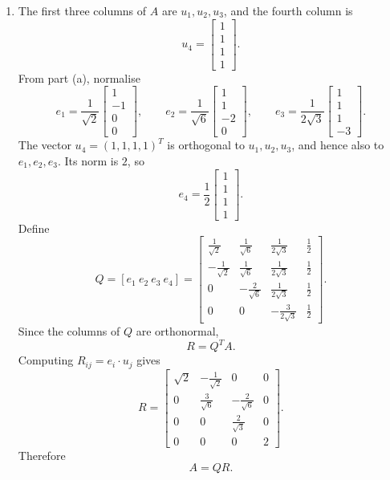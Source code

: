 \documentclass[12pt]{article}
\begin{document}
\begin{enumerate}[label=(\alph*)]
  \item The first three columns of $A$ are $u_1,u_2,u_3$, and the fourth column is
  \[
  u_4=\begin{bmatrix}1\\1\\1\\1\end{bmatrix}.
  \]
  From part (a), normalise
  \[
  e_1=\frac1{\sqrt2}\begin{bmatrix}1\\-1\\0\\0\end{bmatrix},
  \qquad
  e_2=\frac1{\sqrt6}\begin{bmatrix}1\\1\\-2\\0\end{bmatrix},
  \qquad
  e_3=\frac1{2\sqrt3}\begin{bmatrix}1\\1\\1\\-3\end{bmatrix}.
  \]
  The vector $u_4=(1,1,1,1)^T$ is orthogonal to $u_1,u_2,u_3$, and hence also to $e_1,e_2,e_3$. Its norm is $2$, so
  \[
  e_4=\frac12\begin{bmatrix}1\\1\\1\\1\end{bmatrix}.
  \]
  Define
  \[
  Q=[e_1\ e_2\ e_3\ e_4]
  =
  \begin{bmatrix}
  \frac1{\sqrt2}&\frac1{\sqrt6}&\frac1{2\sqrt3}&\frac12\\[0.3em]
  -\frac1{\sqrt2}&\frac1{\sqrt6}&\frac1{2\sqrt3}&\frac12\\[0.3em]
  0&-\frac2{\sqrt6}&\frac1{2\sqrt3}&\frac12\\[0.3em]
  0&0&-\frac3{2\sqrt3}&\frac12
  \end{bmatrix}.
  \]
  Since the columns of $Q$ are orthonormal,
  \[
  R=Q^TA.
  \]
  Computing $R_{ij}=e_i\cdot u_j$ gives
  \[
  R=\begin{bmatrix}
  \sqrt2&-\frac1{\sqrt2}&0&0\\[0.3em]
  0&\frac3{\sqrt6}&-\frac2{\sqrt6}&0\\[0.3em]
  0&0&\frac2{\sqrt3}&0\\[0.3em]
  0&0&0&2
  \end{bmatrix}.
  \]
  Therefore
  \[
  \boxed{A=QR.}
  \]
\end{enumerate}
\end{document}
